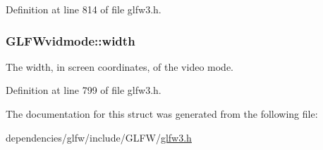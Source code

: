 Definition at line 814 of file glfw3.\-h.

\hypertarget{struct_g_l_f_wvidmode_a698dcb200562051a7249cb6ae154c71d}{
\subsubsection[{width}]{ G\-L\-F\-Wvidmode\-::width}}\label{struct_g_l_f_wvidmode_a698dcb200562051a7249cb6ae154c71d}
The width, in screen coordinates, of the video mode. 

Definition at line 799 of file glfw3.\-h.



The documentation for this struct was generated from the following file\-:\begin{DoxyCompactItemize}
\item 
dependencies/glfw/include/\-G\-L\-F\-W/\hyperlink{glfw3_8h}{glfw3.\-h}\end{DoxyCompactItemize}

